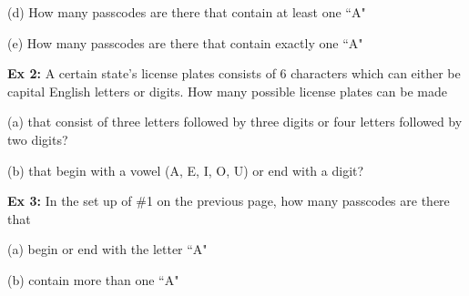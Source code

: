 \documentclass[fleqn]{article}
\theoremstyle{definition}
\begin{document}
\vspace{5cm} 


(d) How many passcodes are there that contain at least one ``A"

\vspace{5.5cm} 
(e)  How many passcodes are there that contain exactly one ``A"


\vspace{4cm} 




\newpage 





\textbf{Ex 2:} A certain state's license plates consists of 6 characters which can either be capital English letters or digits. How many possible license plates can be made

\vspace{.25cm} 
(a) that consist of three letters followed by three digits or four letters followed by two digits? 

\vspace{5cm}




(b) that begin with a vowel (A, E, I, O, U) or end with a digit?



\vspace{5cm}



\textbf{Ex 3:} In the set up of \#1 on the previous page, how many passcodes are there that 

\vspace{.25cm}
(a) begin or end with the letter ``A"

\vspace{5cm}
(b) contain more than one ``A"
\end{document}
